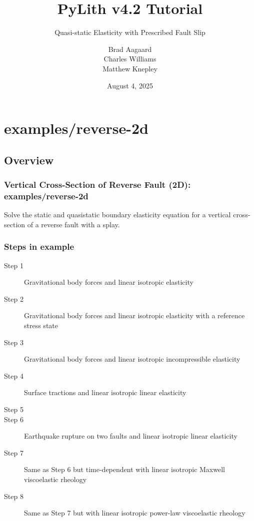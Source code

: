 \documentclass[aspectratio=169]{beamer}
\title{PyLith v4.2 Tutorial}
\subtitle{Quasi-static Elasticity with Prescribed Fault Slip}
\author{Brad Aagaard\\
  Charles Williams \\
  Matthew Knepley}
\institute{\texttt{[image: ../../logos/cig\_logo\_dots]}%
  \hspace{4em}%
\raisebox{1em}{\texttt{[image: ../../logos/cig\_short\_pylith]}}}
\date{August 4, 2025}
\begin{document}
\maketitle


\section{{\ttfamily examples/reverse-2d}}

\subsection{Overview}

\begin{frame}
  \frametitle{Vertical Cross-Section of Reverse Fault (2D): {\ttfamily examples/reverse-2d}}
  \summary{}


  \vfill
  Solve the static and quasistatic boundary elasticity equation for a vertical cross-section of a reverse fault with a splay.
  
\end{frame}


\begin{frame}
  \frametitle{Steps in example}

  \begin{description}
    \item[Step 1] Gravitational body forces and linear isotropic elasticity
    \item[Step 2] Gravitational body forces and linear isotropic elasticity with a reference stress state
    \item[Step 3] Gravitational body forces and linear isotropic incompressible elasticity
    \item[Step 4] Surface tractions and linear isotropic linear elasticity
    \item[Step 5] 
    \item[Step 6] Earthquake rupture on two faults and linear isotropic linear elasticity
    \item[Step 7] Same as Step 6 but time-dependent with linear isotropic Maxwell viscoelastic rheology
    \item[Step 8] Same as Step 7 but with linear isotropic power-law viscoelastic rheology
  \end{description}
  
\end{frame}
\end{document}
